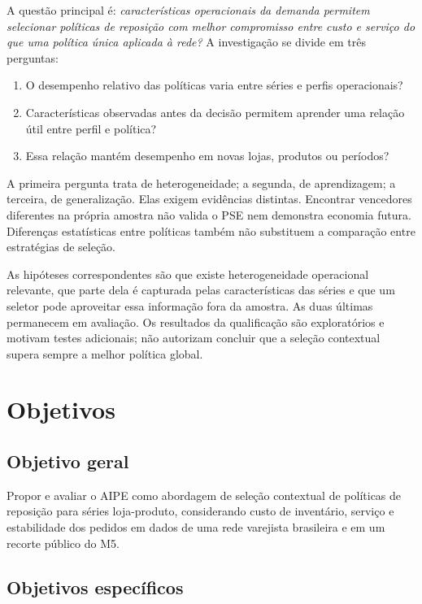 A questão principal é: \emph{características operacionais da demanda permitem selecionar políticas de reposição com melhor compromisso entre custo e serviço do que uma política única aplicada à rede?} A investigação se divide em três perguntas:

\begin{enumerate}
  \item O desempenho relativo das políticas varia entre séries e perfis operacionais?
  \item Características observadas antes da decisão permitem aprender uma relação útil entre perfil e política?
  \item Essa relação mantém desempenho em novas lojas, produtos ou períodos?
\end{enumerate}

A primeira pergunta trata de heterogeneidade; a segunda, de aprendizagem; a terceira, de generalização. Elas exigem evidências distintas. Encontrar vencedores diferentes na própria amostra não valida o PSE nem demonstra economia futura. Diferenças estatísticas entre políticas também não substituem a comparação entre estratégias de seleção.

As hipóteses correspondentes são que existe heterogeneidade operacional relevante, que parte dela é capturada pelas características das séries e que um seletor pode aproveitar essa informação fora da amostra. As duas últimas permanecem em avaliação. Os resultados da qualificação são exploratórios e motivam testes adicionais; não autorizam concluir que a seleção contextual supera sempre a melhor política global.

\section{Objetivos}

\subsection*{Objetivo geral}

Propor e avaliar o AIPE como abordagem de seleção contextual de políticas de reposição para séries loja-produto, considerando custo de inventário, serviço e estabilidade dos pedidos em dados de uma rede varejista brasileira e em um recorte público do M5.

\subsection*{Objetivos específicos}

